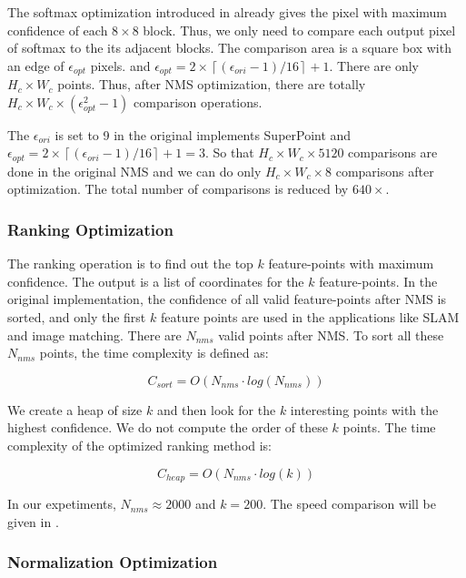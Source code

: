 The softmax optimization introduced in  already gives the pixel with maximum confidence of each $8 \times 8$ block. Thus, we only need to compare each output pixel of softmax to the its adjacent blocks. The comparison area is a square box with an edge of $\epsilon _{opt}$ pixels. and $\epsilon _{opt} = 2\times \left \lceil (\epsilon _{ori}-1)/16 \right \rceil +1$. There are only $H_c \times W_c$ points. Thus, after NMS optimization, there are totally $H_c \times W_c \times (\epsilon _{opt} ^ 2 - 1)$ comparison operations.

The $\epsilon _{ori}$ is set to 9 in the original implements SuperPoint and $\epsilon _{opt} = 2\times \left \lceil (\epsilon _{ori}-1)/16 \right \rceil +1 = 3$. So that $H_c \times W_c \times 5120 $ comparisons are done in the original NMS and we can do only $H_c \times W_c \times 8$ comparisons after optimization. The total number of comparisons is reduced by $640\times$.

\subsubsection{Ranking Optimization}

The ranking operation is to find out the top $k$ feature-points with maximum confidence. 
The output is a list of coordinates for the $k$ feature-points. 
In the original implementation, the confidence of all valid feature-points after NMS is sorted, and only the first $k$ feature points are used in the applications like SLAM and image matching. 
There are $N_{nms}$ valid points after NMS. To sort all these $N_{nms}$ points, the time complexity is defined as:

\begin{equation}
    C_{sort} = O(N_{nms} \cdot log(N_{nms}))
    \label{equ:csort}
\end{equation}

We create a heap of size $k$ and then look for the $k$ interesting points with the highest confidence. We do not compute the order of these $k$ points. The time complexity of the optimized ranking method is:

\begin{equation}
    C_{heap} = O(N_{nms} \cdot log(k))
    \label{equ:optsort}
\end{equation}

In our expetiments, $N_{nms} \approx 2000$ and $k = 200$. The speed comparison will be given in .

\subsubsection{Normalization Optimization}


